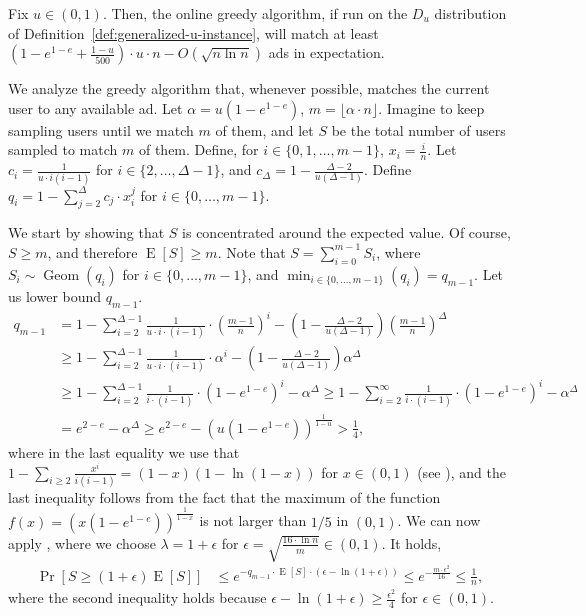 \documentclass[11pt]{article}
\DeclareMathOperator{\geom}{Geom}
\DeclareMathOperator*{\E}{E}
\begin{document}
\begin{lemmarep}\label{lem:online-matching-u-instance}
Fix $u \in (0,1)$. Then, the online greedy algorithm, if run on the $D_u$ distribution of Definition~\ref{def:generalized-u-instance}, will match at least $\left(1-e^{1-e}+\frac{1-u}{500} \right)  \cdot u \cdot  n - O(\sqrt{n \ln n})$ ads in expectation. \end{lemmarep}
\begin{appendixproof}
We analyze the greedy algorithm that, whenever possible, matches the current user to any available ad. Let $\alpha=u(1-e^{1-e})$, $m=\lfloor \alpha \cdot n \rfloor$. Imagine to keep sampling users until we match $m$ of them, and let $S$ be the total number of users sampled to match $m$ of them. Define, for $i\in\{0,1,\dots,m-1\}$, $x_i=\frac{i}{n}$. Let $c_i=\frac{1}{u\cdot i(i-1)}$ for $i\in\{2,\dots, \Delta-1\}$, and $c_{\Delta}=1 - \frac{\Delta-2}{u(\Delta-1)}$. Define $q_i=1-\sum_{j=2}^\Delta c_j\cdot x_i^j$ for $i\in\{0,\dots, m-1\}$.

We start by showing that $S$ is concentrated around the expected value. Of course, $S\geq m$, and therefore $\E[S] \geq m$. Note that $S=\sum_{i=0}^{m-1} S_i$, where $S_i\sim\geom(q_i)$ for $i\in\{0,\dots, m-1\}$, and $\min_{i\in\{0,\dots, m-1\}}(q_i) = q_{m-1}$. Let us lower bound $q_{m-1}$.
\begin{align*}
q_{m-1} &= 1 - \sum_{i=2}^{\Delta-1} \frac{1}{u\cdot i \cdot (i-1)}\cdot \left(\frac{m-1}{n}\right)^i - \left(1-\frac{\Delta-2}{u(\Delta-1)}\right) \left(\frac{m-1}{n}\right)^\Delta\\
& \geq  1 - \sum_{i=2}^{\Delta-1} \frac{1}{u\cdot i \cdot (i-1)}\cdot \alpha^i - \left(1-\frac{\Delta-2}{u(\Delta-1)}\right) \alpha^\Delta\\
&\geq 1 - \sum_{i=2}^{\Delta-1} \frac{1}{i \cdot (i-1)}\cdot (1-e^{1-e})^i -\alpha^\Delta  \geq 1 - \sum_{i=2}^{\infty} \frac{1}{i \cdot (i-1)}\cdot (1-e^{1-e})^i -\alpha^\Delta\\
&=e^{2-e} -\alpha^\Delta \geq e^{2-e} - (u(1-e^{1-e}))^{\frac{1}{1-u}}  > \frac{1}{4},
\end{align*}
where in the last equality we use that $1-\sum_{i\geq 2}\frac{x^i}{i(i-1)} = (1-x)(1-\ln(1-x))$ for $x\in(0,1)$ (see ), and the last inequality follows from the fact that the maximum of the function $f(x)=(x(1-e^{1-e}))^{\frac{1}{1-x}}$ is not larger than $1/5$ in $(0,1)$. We can now apply , where we choose $\lambda=1+\epsilon$ for $\epsilon=\sqrt{\frac{16\cdot \ln n}{m}}\in(0,1)$. It holds,
\begin{align*}
\Pr[S\geq (1+\epsilon)\E[S]] &\leq e^{-q_{m-1}\cdot \E[S] \cdot (\epsilon - \ln(1+\epsilon))} \leq e^{-\frac{m \cdot \epsilon^2}{16}}  \leq \frac{1}{n},
\end{align*}
where the second inequality holds because $\epsilon-\ln(1+\epsilon)\geq \frac{\epsilon^2}{4}$ for $\epsilon\in(0,1)$.


\end{appendixproof}
\end{document}
